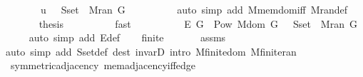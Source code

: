 \begin{isabellebody}
\ \ \ \ \ \ \ \ {\isachardoublequoteopen}u\ {\isasymin}\ {\isasymUnion}\ {\isacharparenleft}{\kern0pt}S{\isachardot}{\kern0pt}set\ {\isacharbackquote}{\kern0pt}\ M{\isachardot}{\kern0pt}ran\ G{\isacharparenright}{\kern0pt}{\isachardoublequoteclose}\isanewline
\ \ \ \ \ \ \ \ \isamarkupfalse%
\ {\isacharparenleft}{\kern0pt}auto\ simp\ add{\isacharcolon}{\kern0pt}\ M{\isachardot}{\kern0pt}mem{\isacharunderscore}{\kern0pt}dom{\isacharunderscore}{\kern0pt}iff\ M{\isachardot}{\kern0pt}ran{\isacharunderscore}{\kern0pt}def{\isacharparenright}{\kern0pt}\isanewline
\ \ \ \ \ \ \isamarkupfalse%
\ {\isacharquery}{\kern0pt}thesis\isanewline
\ \ \ \ \ \ \ \ \isamarkupfalse%
\ fast\isanewline
\ \ \ \ \isamarkupfalse%
\ \isacommand{{\isacharbraceright}{\kern0pt}}\isamarkupfalse%
\isanewline
\ \ \isamarkupfalse%
\ {\isachardoublequoteopen}E\ G\ {\isasymsubseteq}\ Pow\ {\isacharparenleft}{\kern0pt}M{\isachardot}{\kern0pt}dom\ G\ {\isasymunion}\ {\isasymUnion}\ {\isacharparenleft}{\kern0pt}S{\isachardot}{\kern0pt}set\ {\isacharbackquote}{\kern0pt}\ M{\isachardot}{\kern0pt}ran\ G{\isacharparenright}{\kern0pt}{\isacharparenright}{\kern0pt}{\isachardoublequoteclose}\isanewline
\ \ \ \ \isamarkupfalse%
\ {\isacharparenleft}{\kern0pt}auto\ simp\ add{\isacharcolon}{\kern0pt}\ E{\isacharunderscore}{\kern0pt}def{\isacharparenright}{\kern0pt}\isanewline
\ \ \isamarkupfalse%
\ {\isachardoublequoteopen}finite\ {\isachardot}{\kern0pt}{\isachardot}{\kern0pt}{\isachardot}{\kern0pt}{\isachardoublequoteclose}\isanewline
\ \ \ \ \isamarkupfalse%
\ assms\isanewline
\ \ \ \ \isamarkupfalse%
\ {\isacharparenleft}{\kern0pt}auto\ simp\ add{\isacharcolon}{\kern0pt}\ S{\isachardot}{\kern0pt}set{\isacharunderscore}{\kern0pt}def\ dest{\isacharcolon}{\kern0pt}\ invarD{\isacharparenleft}{\kern0pt}{}{\isacharparenright}{\kern0pt}\ intro{\isacharcolon}{\kern0pt}\ M{\isachardot}{\kern0pt}finite{\isacharunderscore}{\kern0pt}dom\ M{\isachardot}{\kern0pt}finite{\isacharunderscore}{\kern0pt}ran{\isacharparenright}{\kern0pt}\isanewline
{}\isamarkupfalse%
%
\endisatagproof
{\isafoldproof}%
%
\isadelimproof
\isanewline
%
\endisadelimproof
\isanewline
{}\isamarkupfalse%
\ {\isacharparenleft}{\kern0pt}\ symmetric{\isacharunderscore}{\kern0pt}adjacency{\isacharparenright}{\kern0pt}\ mem{\isacharunderscore}{\kern0pt}adjacency{\isacharunderscore}{\kern0pt}iff{\isacharunderscore}{\kern0pt}edge{\isacharcolon}{\kern0pt}\isanewline

\end{isabellebody}
